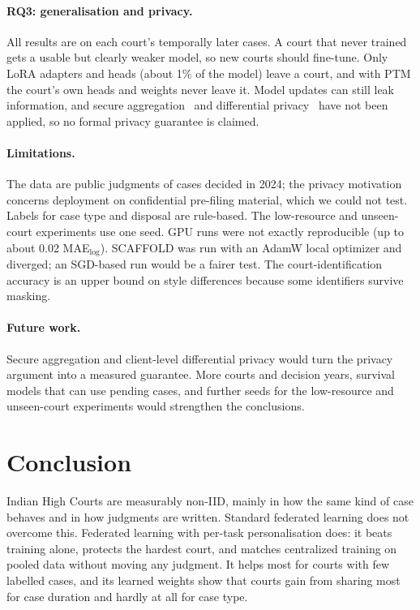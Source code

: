\documentclass[11pt,a4paper]{article}
\newcommand{\mae}{MAE$_{\log}$}
\begin{document}
\paragraph{RQ3: generalisation and privacy.} All results are on each court's temporally later cases. A
court that never trained gets a usable but clearly weaker model, so new courts should fine-tune. Only
LoRA adapters and heads (about 1\% of the model) leave a court, and with PTM the court's own heads and
weights never leave it. Model updates can still leak information, and secure
aggregation~\cite{bonawitz2017secagg} and differential privacy~\cite{mcmahan2018dp} have not been
applied, so no formal privacy guarantee is claimed.

\paragraph{Limitations.} The data are public judgments of cases decided in 2024; the privacy motivation
concerns deployment on confidential pre-filing material, which we could not test. Labels for case type
and disposal are rule-based. The low-resource and unseen-court experiments use one seed. GPU runs were
not exactly reproducible (up to about 0.02 \mae{}). SCAFFOLD was run with an AdamW local optimizer and
diverged; an SGD-based run would be a fairer test. The court-identification accuracy is an upper bound
on style differences because some identifiers survive masking.

\paragraph{Future work.} Secure aggregation and client-level differential privacy would turn the privacy
argument into a measured guarantee. More courts and decision years, survival models that can use
pending cases, and further seeds for the low-resource and unseen-court experiments would strengthen the
conclusions.

\section{Conclusion}
Indian High Courts are measurably non-IID, mainly in how the same kind of case behaves and in how
judgments are written. Standard federated learning does not overcome this. Federated learning with
per-task personalisation does: it beats training alone, protects the hardest court, and matches
centralized training on pooled data without moving any judgment. It helps most for courts with few
labelled cases, and its learned weights show that courts gain from sharing most for case duration and
hardly at all for case type.
\end{document}
